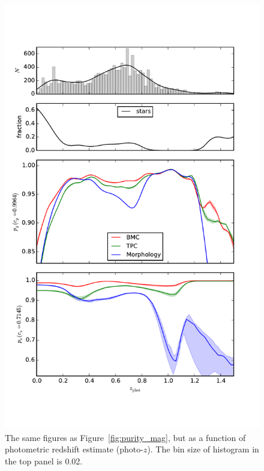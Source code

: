 \documentclass[useAMS,usenatbib]{mn2e}
\begin{document}
\begin{figure}
  \centering
  \includegraphics[width=\linewidth]{figures/purity_z.pdf}
  \caption{The same figures as Figure~\ref{fig:purity_mag},
           but as a function of photometric redshift estimate
           (photo-$z$).
           The bin size of histogram in the top panel is 0.02.}
  \label{fig:purity_z}
\end{figure}
\end{document}

